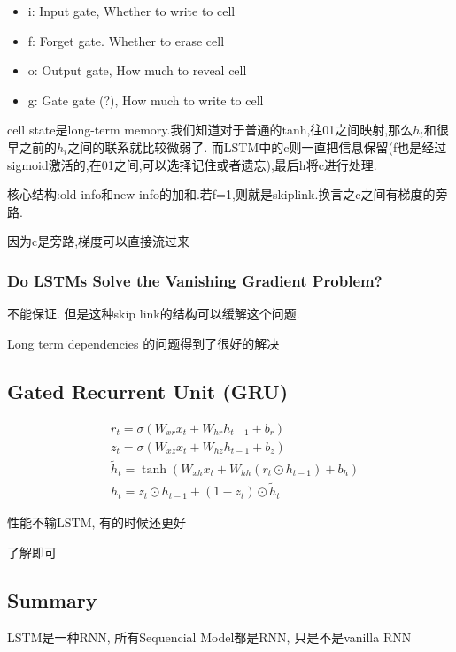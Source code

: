 	\begin{itemize}
		\item i: Input gate, Whether to write to cell
		\item f: Forget gate. Whether to erase cell
		\item o: Output gate, How much to reveal cell
		\item g: Gate gate (?), How much to write to cell
	\end{itemize}
	
	cell state是long-term memory.我们知道对于普通的tanh,往01之间映射,那么$h_t$和很早之前的$h_i$之间的联系就比较微弱了.
	而LSTM中的c则一直把信息保留(f也是经过sigmoid激活的,在01之间,可以选择记住或者遗忘),最后h将c进行处理.
	
	核心结构:old info和new info的加和.若f=1,则就是skiplink.换言之c之间有梯度的旁路.

	因为c是旁路,梯度可以直接流过来

	\subsubsection{Do LSTMs Solve the Vanishing Gradient Problem?}

	不能保证. 但是这种skip link的结构可以缓解这个问题.

	Long term dependencies 的问题得到了很好的解决

	\subsection{Gated Recurrent Unit (GRU)}

	\[
	\begin{aligned}
		&r_{t} =\sigma(W_{xr}x_t+W_{hr}h_{t-1}+b_r)  \\
		&z_{t} =\sigma(W_{xz}x_t+W_{hz}h_{t-1}+b_z)  \\
		&\tilde{h}_{t} =\tanh(W_{xh}x_t+W_{hh}(r_t\odot h_{t-1})+b_h)  \\
		&h_t =z_t\odot h_{t-1}+(1-z_t)\odot\tilde{h}_t 
	\end{aligned}	
	\]

	性能不输LSTM, 有的时候还更好

	了解即可

	\subsection{Summary}

	LSTM是一种RNN, 所有Sequencial Model都是RNN, 只是不是vanilla RNN